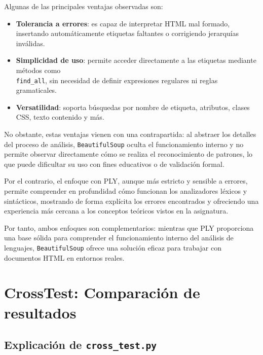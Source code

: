 \documentclass[11pt,a4paper]{article}
\begin{document}
\medskip

Algunas de las principales ventajas observadas son:

\begin{itemize}
    \item \textbf{Tolerancia a errores}: es capaz de interpretar HTML mal formado, insertando automáticamente etiquetas faltantes o corrigiendo jerarquías inválidas.
    \item \textbf{Simplicidad de uso}: permite acceder directamente a las etiquetas mediante métodos como\\ \texttt{find\_all}, sin necesidad de definir expresiones regulares ni reglas gramaticales.
    \item \textbf{Versatilidad}: soporta búsquedas por nombre de etiqueta, atributos, clases CSS, texto contenido y más.
\end{itemize}

\medskip

No obstante, estas ventajas vienen con una contrapartida: al abstraer los detalles del proceso de análisis, \texttt{BeautifulSoup} oculta el funcionamiento interno y no permite observar directamente cómo se realiza el reconocimiento de patrones, lo que puede dificultar su uso con fines educativos o de validación formal.

\medskip

Por el contrario, el enfoque con PLY, aunque más estricto y sensible a errores, permite comprender en profundidad cómo funcionan los analizadores léxicos y sintácticos, mostrando de forma explícita los errores encontrados y ofreciendo una experiencia más cercana a los conceptos teóricos vistos en la asignatura.

\medskip

Por tanto, ambos enfoques son complementarios: mientras que PLY proporciona una base sólida para comprender el funcionamiento interno del análisis de lenguajes, \texttt{BeautifulSoup} ofrece una solución eficaz para trabajar con documentos HTML en entornos reales.

\section{CrossTest: Comparación de resultados}
\subsection{Explicación de \texttt{cross\_test.py}}
\end{document}
